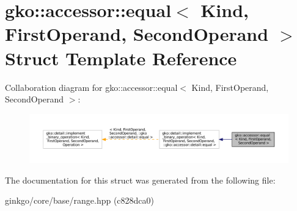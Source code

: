 \hypertarget{structgko_1_1accessor_1_1equal}{}\section{gko\+:\+:accessor\+:\+:equal$<$ Kind, First\+Operand, Second\+Operand $>$ Struct Template Reference}
\label{structgko_1_1accessor_1_1equal}


Collaboration diagram for gko\+:\+:accessor\+:\+:equal$<$ Kind, First\+Operand, Second\+Operand $>$\+:
\nopagebreak
\begin{figure}[H]
\begin{center}
\leavevmode
\includegraphics[width=350pt]{structgko_1_1accessor_1_1equal__coll__graph}
\end{center}
\end{figure}


The documentation for this struct was generated from the following file\+:\begin{DoxyCompactItemize}
\item 
ginkgo/core/base/range.\+hpp (c828dca0)\end{DoxyCompactItemize}
